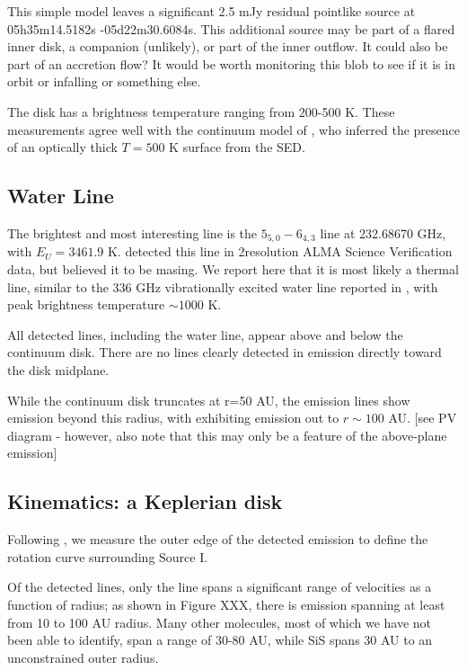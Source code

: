 \documentclass[twocolumn]{aastex61}
\begin{document}
This simple model leaves a significant 2.5 mJy residual pointlike source at 
05h35m14.5182s -05d22m30.6084s.  This additional source may be part of a flared
inner disk, a companion (unlikely), or part of the inner outflow.  It could
also be part of an accretion flow?  It would be worth monitoring this blob
to see if it is in orbit or infalling or something else.

The disk has a brightness temperature ranging from 200-500 K.  These measurements
agree well with the continuum model of \citet{Plambeck2016a}, who inferred
the presence of an optically thick $T=500$ K surface from the SED.

\subsection{Water Line}
The brightest and most interesting line is the \water $5_{5,0}-6_{4,3}$ line at
232.68670 GHz, with $E_U=3461.9$ K.  \citet{Hirota2012a} detected this line
in 2\arcsec resolution ALMA Science Verification data, but believed it to be masing.
We report here that it is most likely a thermal line, similar to the 336 GHz vibrationally
excited water line reported in \citet{Hirota2014a}, with peak brightness
temperature $\sim1000$ K.

All detected lines, including the water line, appear above and below the
continuum disk.  There are no lines clearly detected in emission directly
toward the disk midplane.

While the continuum disk truncates at r=50 AU, the emission lines show emission
beyond this radius, with \water exhibiting emission out to $r\sim100$ AU.
[see PV diagram - however, also note that this may only be a feature of the
above-plane emission]

\subsection{Kinematics: a Keplerian disk}
Following \citet{Seifried2016a}, we measure the outer edge of the detected
emission to define the rotation curve surrounding Source I.

Of the detected lines, only the \water line spans a significant range of velocities
as a function of radius; as shown in Figure XXX, there is \water emission
spanning at least from 10 to 100 AU radius.  Many other molecules, most of
which we have not been able to identify, span a range of 30-80 AU, while SiS
spans 30 AU to an unconstrained outer radius.
\end{document}

